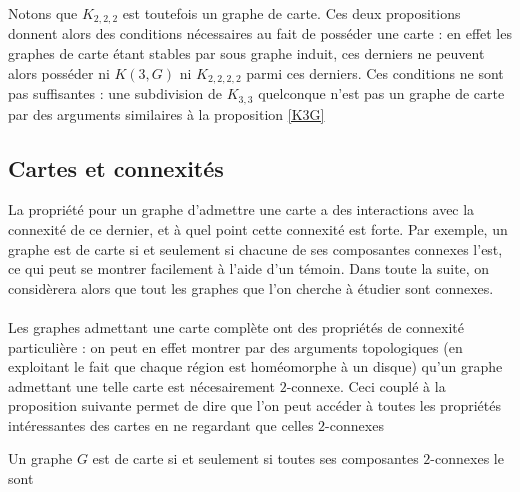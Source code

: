 \documentclass{scrartcl}
\begin{document}
\begin{flushleft}
Notons que $K_{2,2,2}$ est toutefois un graphe de carte. Ces deux propositions donnent alors des conditions nécessaires au fait
de posséder une carte : en effet les graphes de carte étant stables par sous graphe induit, ces derniers ne peuvent alors
posséder ni $K(3, G)$ ni $K_{2,2,2,2}$ parmi ces derniers. Ces conditions ne sont pas suffisantes : une subdivision
de $K_{3,3}$ quelconque n'est pas un graphe de carte par des arguments similaires à la proposition \ref{K3G}

\subsection{Cartes et connexités}\label{cartesetconnex}

La propriété pour un graphe d'admettre une carte a des interactions avec la connexité de ce dernier, et à quel point cette connexité
est forte. Par exemple, un graphe est de carte si et seulement si chacune de ses composantes connexes l'est, ce qui peut se montrer
facilement à l'aide d'un témoin. Dans toute la suite, on considèrera alors que tout les graphes que l'on cherche à étudier sont connexes.
\\~\\
Les graphes admettant une carte complète ont des propriétés de connexité particulière : on peut en effet montrer par des arguments
topologiques (en exploitant le fait que chaque région est homéomorphe à un disque) qu'un graphe admettant une telle carte
est nécesairement $2$-connexe. Ceci couplé à la proposition suivante permet de dire que l'on peut accéder à toutes les propriétés
intéressantes des cartes en ne regardant que celles $2$-connexes

\begin{prop}\label{suffbiconn}
    Un graphe $G$ est de carte si et seulement si toutes ses composantes $2$-connexes le sont
\end{prop}


\end{flushleft}
\end{document}
